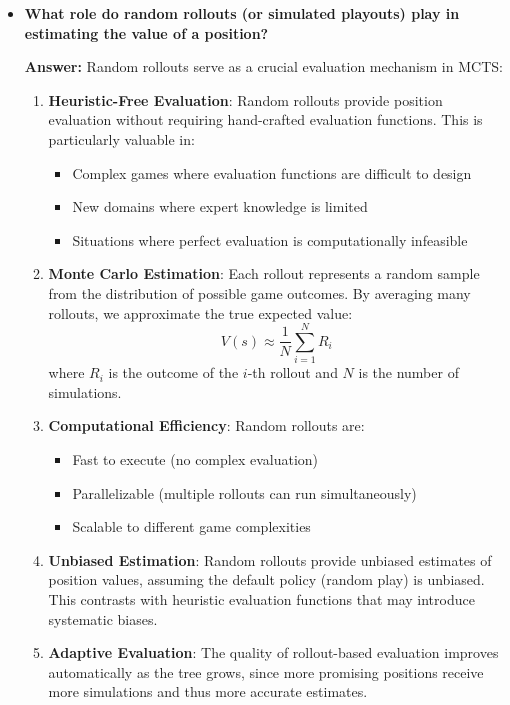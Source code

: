 \begin{itemize}
   \item \textbf{What role do random rollouts (or simulated playouts) play in estimating the value of a position?}
   
   \textbf{Answer:} Random rollouts serve as a crucial evaluation mechanism in MCTS:
   
   \begin{enumerate}
       \item \textbf{Heuristic-Free Evaluation}: Random rollouts provide position evaluation without requiring hand-crafted evaluation functions. This is particularly valuable in:
       \begin{itemize}
           \item Complex games where evaluation functions are difficult to design
           \item New domains where expert knowledge is limited
           \item Situations where perfect evaluation is computationally infeasible
       \end{itemize}
       
       \item \textbf{Monte Carlo Estimation}: Each rollout represents a random sample from the distribution of possible game outcomes. By averaging many rollouts, we approximate the true expected value:
       \[V(s) \approx \frac{1}{N} \sum_{i=1}^{N} R_i\]
       where $R_i$ is the outcome of the $i$-th rollout and $N$ is the number of simulations.
       
       \item \textbf{Computational Efficiency}: Random rollouts are:
       \begin{itemize}
           \item Fast to execute (no complex evaluation)
           \item Parallelizable (multiple rollouts can run simultaneously)
           \item Scalable to different game complexities
       \end{itemize}
       
       \item \textbf{Unbiased Estimation}: Random rollouts provide unbiased estimates of position values, assuming the default policy (random play) is unbiased. This contrasts with heuristic evaluation functions that may introduce systematic biases.
       
       \item \textbf{Adaptive Evaluation}: The quality of rollout-based evaluation improves automatically as the tree grows, since more promising positions receive more simulations and thus more accurate estimates.
   \end{enumerate}
\end{itemize}


